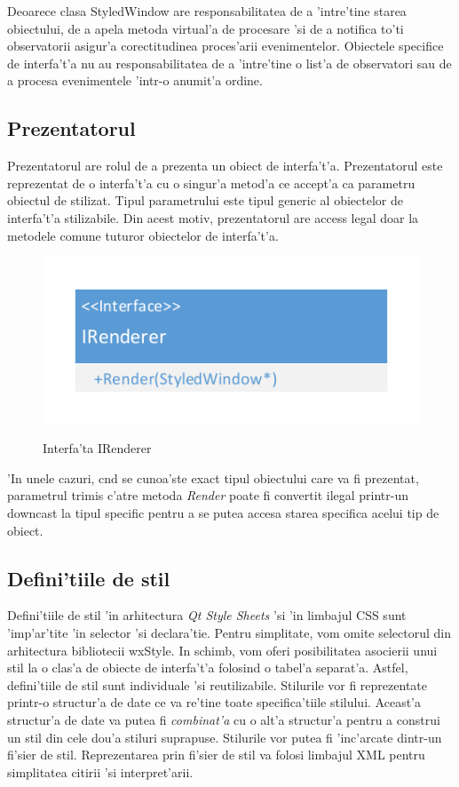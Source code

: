 Deoarece clasa StyledWindow are responsabilitatea de a 'intre'tine starea obiectului, de a apela metoda virtual'a de procesare 'si de a notifica to'ti observatorii asigur'a corectitudinea proces'arii evenimentelor. Obiectele specifice de interfa't'a nu au responsabilitatea de a 'intre'tine o list'a de observatori sau de a procesa evenimentele 'intr-o anumit'a ordine.



\subsection{Prezentatorul}

Prezentatorul are rolul de a prezenta un obiect de interfa't'a. Prezentatorul este reprezentat de o interfa't'a cu o singur'a metod'a ce accept'a ca parametru obiectul de stilizat. Tipul parametrului este tipul generic al obiectelor de interfa't'a stilizabile. Din acest motiv, prezentatorul are access legal doar la metodele comune tuturor obiectelor de interfa't'a.

\begin{center}
\begin{figure}[h]
    \centering
    \includegraphics{img/irenderer.pdf}
    \label{ch2_arhitectura_bloc}
    \caption{Interfa'ta IRenderer}
\end{figure}
\end{center}

'In unele cazuri, c{\ia}nd se cunoa'ste exact tipul obiectului care va fi prezentat, parametrul trimis c'atre metoda \emph{Render} poate fi convertit ilegal printr-un downcast la tipul specific pentru a se putea accesa starea specifica acelui tip de obiect.

\subsection{Defini'tiile de stil}

Defini'tiile de stil 'in arhitectura \emph{Qt Style Sheets} 'si 'in limbajul CSS sunt 'imp'ar'tite 'in selector 'si declara'tie. Pentru simplitate, vom omite selectorul din arhitectura bibliotecii wxStyle. In schimb, vom oferi posibilitatea asocierii unui stil la o clas'a de obiecte de interfa't'a folosind o tabel'a separat'a. Astfel, defini'tiile de stil sunt individuale 'si reutilizabile. Stilurile vor fi reprezentate printr-o structur'a de date ce va re'tine toate specifica'tiile stilului. Aceast'a structur'a de date va putea fi \emph{combinat'a} cu o alt'a structur'a pentru a construi un stil din cele dou'a stiluri suprapuse. Stilurile vor putea fi 'inc'arcate dintr-un fi'sier de stil. Reprezentarea prin fi'sier de stil va folosi limbajul XML pentru simplitatea citirii 'si interpret'arii.


